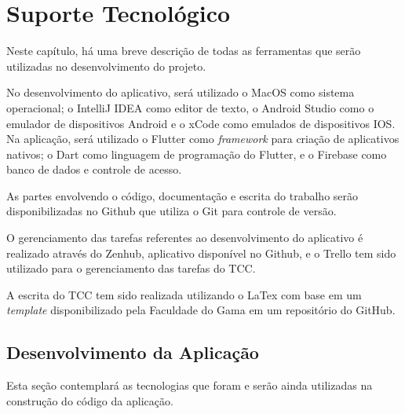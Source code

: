 \chapter[Suporte Tecnológico]{Suporte Tecnológico}
\label{ch:suporte}

Neste capítulo, há uma breve descrição de todas as ferramentas que serão 
utilizadas no desenvolvimento do projeto. 

No desenvolvimento do aplicativo, será utilizado o MacOS como sistema 
operacional; o IntelliJ IDEA como editor de texto, o Android Studio como 
o emulador de dispositivos Android e o xCode como emulados de dispositivos IOS. 
Na aplicação, será utilizado o Flutter 
como \emph{framework} para criação de aplicativos nativos; o Dart como linguagem 
de programação do Flutter, e o Firebase como banco de dados e controle de acesso. 

As partes envolvendo o código, documentação e escrita do trabalho serão disponibilizadas 
no Github que utiliza o Git para controle de versão.

O gerenciamento das tarefas referentes ao desenvolvimento do aplicativo é realizado através do Zenhub, 
aplicativo disponível no Github, 
e o Trello tem sido utilizado para o gerenciamento das tarefas do TCC. 

A escrita do TCC tem sido realizada utilizando o LaTex com base em um \emph{template} 
disponibilizado pela Faculdade do Gama em um repositório do GitHub. 


\section{Desenvolvimento da Aplicação}

Esta seção contemplará as tecnologias que foram e serão ainda utilizadas na construção do 
código da aplicação.



